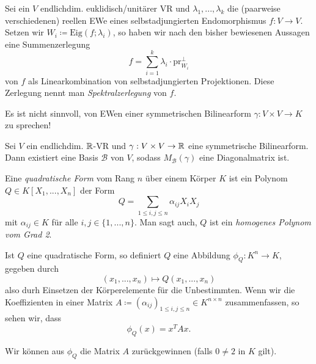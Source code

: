 \documentclass{cheat-sheet}
\newcommand{\Eig}{\mathrm{Eig}}
\newcommand{\BB}{\mathcal{B}}
\begin{document}

\begin{defn}
  Sei ein $V$ endlichdim. euklidisch/unitärer VR und $\lambda_1, ..., \lambda_k$ die (paarweise verschiedenen) reellen EWe eines selbstadjungierten Endomorphismus $f : V \to V$. Setzen wir $W_i \coloneqq \Eig(f; \lambda_i)$, so haben wir nach den bisher bewiesenen Aussagen eine Summenzerlegung
  \[ f = \sum_{i=1}^k \lambda_i \cdot \mathrm{pr}_{W_i}^{\perp} \]
  von $f$ als Linearkombination von selbstadjungierten Projektionen. Diese Zerlegung nennt man \emph{Spektralzerlegung} von $f$.
\end{defn}

\begin{bem}
  Es ist nicht sinnvoll, von EWen einer symmetrischen Bilinearform $\gamma : V \times V \to K$ zu sprechen!
\end{bem}

\begin{satz}
  Sei $V$ ein endlichdim. $\mathbb{R}$-VR und $\gamma : V \times V \to \mathbb{R}$ eine symmetrische Bilinearform. Dann existiert eine Basis $\BB$ von $V$, sodass $M_{\BB}(\gamma)$ eine Diagonalmatrix ist.
\end{satz}

\begin{defn}
  Eine \emph{quadratische Form} vom Rang $n$ über einem Körper $K$ ist ein Polynom $Q \in K[X_1, ..., X_n]$ der Form
  \[ Q = \sum_{1 \le i,j \le n} \alpha_{ij} X_i X_j \]
  mit $\alpha_{ij} \in K$ für alle $i, j \in \{ 1, ..., n \}$. Man sagt auch, $Q$ ist ein \emph{homogenes Polynom vom Grad 2}.
\end{defn}

\begin{bem}
  Ist $Q$ eine quadratische Form, so definiert $Q$ eine Abbildung $\phi_Q : K^n \to K$, gegeben durch
  \[ (x_1, ..., x_n) \mapsto Q(x_1, ..., x_n) \]
  also durh Einsetzen der Körperelemente für die Unbestimmten. Wenn wir die Koeffizienten in einer Matrix $A \coloneqq (\alpha_{ij})_{1 \le i, j \le n} \in K^{n \times n}$ zusammenfassen, so sehen wir, dass
  \[ \phi_Q(x) = x^T A x. \]
\end{bem}

\begin{satz}
  Wir können aus $\phi_Q$ die Matrix $A$ zurückgewinnen (falls $0 \not= 2$ in $K$ gilt).
\end{satz}

\end{document}
